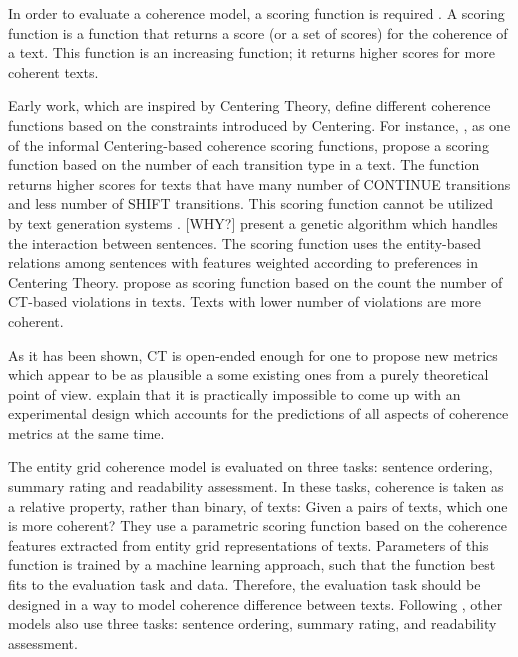  
In order to evaluate a coherence model, a scoring function is required \cite{karamanis04}.   
A scoring function is a function that returns a score (or a set of scores) for the coherence of a text.  
This function is an increasing function; it returns higher scores for more coherent texts. 

Early work, which are inspired by Centering Theory, define different coherence functions based on the constraints introduced by Centering.    
For instance,  , as one of the informal Centering-based coherence scoring functions, propose a scoring function based on the number of each transition type in a text.  
The function returns higher scores for texts that have many number of CONTINUE transitions and less number of SHIFT transitions. 
This scoring function cannot be utilized by text generation systems \cite{karamanis04}. [WHY?] 
 present a genetic algorithm which handles the interaction between sentences.  
The scoring function uses the entity-based relations among sentences with features weighted according to preferences in Centering Theory.  
 propose as scoring function based on the count the number of CT-based violations in texts. Texts with lower number of violations are more coherent. 

As it has been shown, CT is open-ended enough for one to propose new metrics which appear to be as plausible a some existing ones from a purely theoretical point of view. 
 explain that it is practically impossible to come up with an experimental design which accounts for the predictions of all aspects of coherence metrics at the same time. 


The entity grid coherence model \cite{barzilay05a} is evaluated on three tasks: sentence ordering, summary rating and readability assessment. 
In these tasks, coherence is taken as a relative property, rather than binary, of texts: Given a pairs of texts, which one is more coherent? 
They use a parametric scoring function based on the coherence features extracted from entity grid representations of texts.
Parameters of this function is trained by a machine learning approach, such that the function best fits to the evaluation task and data. 
Therefore, the evaluation task should be designed in a way to model coherence difference between texts. 
Following \cite{barzilay05a}, other models \cite{} also use three tasks: sentence ordering, summary rating, and readability assessment. 



